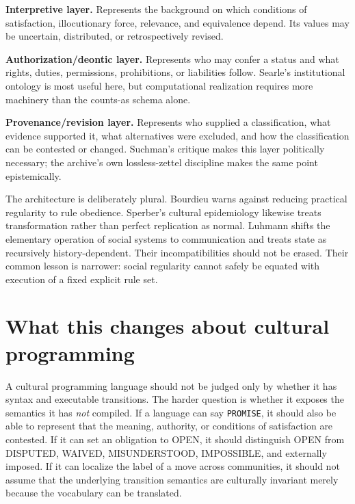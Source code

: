 \documentclass[11pt]{article}
\begin{document}
\textbf{Interpretive layer.} Represents the background on which conditions of satisfaction, illocutionary force, relevance, and equivalence depend. Its values may be uncertain, distributed, or retrospectively revised.\par

\textbf{Authorization/deontic layer.} Represents who may confer a status and what rights, duties, permissions, prohibitions, or liabilities follow. Searle's institutional ontology is most useful here, but computational realization requires more machinery than the counts-as schema alone.\par

\textbf{Provenance/revision layer.} Represents who supplied a classification, what evidence supported it, what alternatives were excluded, and how the classification can be contested or changed. Suchman's critique makes this layer politically necessary; the archive's own lossless-zettel discipline makes the same point epistemically.\par

The architecture is deliberately plural. Bourdieu warns against reducing practical regularity to rule obedience. Sperber's cultural epidemiology likewise treats transformation rather than perfect replication as normal. Luhmann shifts the elementary operation of social systems to communication and treats state as recursively history-dependent. Their incompatibilities should not be erased. Their common lesson is narrower: social regularity cannot safely be equated with execution of a fixed explicit rule set.\par

\section{What this changes about cultural programming}

A cultural programming language should not be judged only by whether it has syntax and executable transitions. The harder question is whether it exposes the semantics it has \emph{not} compiled. If a language can say \texttt{PROMISE}, it should also be able to represent that the meaning, authority, or conditions of satisfaction are contested. If it can set an obligation to OPEN, it should distinguish OPEN from DISPUTED, WAIVED, MISUNDERSTOOD, IMPOSSIBLE, and externally imposed. If it can localize the label of a move across communities, it should not assume that the underlying transition semantics are culturally invariant merely because the vocabulary can be translated.\par
\end{document}
